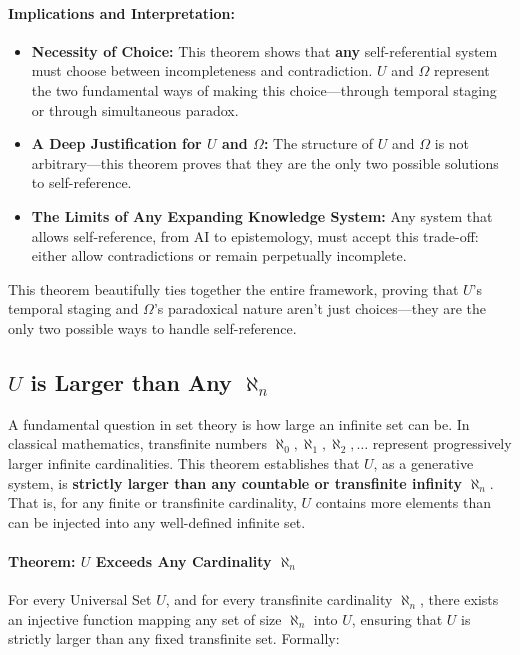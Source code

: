 \documentclass[12pt]{article}
\begin{document}
\paragraph{Implications and Interpretation:}
\begin{itemize}
    \item \textbf{Necessity of Choice:} This theorem shows that \textbf{any} self-referential system must choose between incompleteness and contradiction. \( U \) and \( \Omega \) represent the two fundamental ways of making this choice—through temporal staging or through simultaneous paradox.
    \item \textbf{A Deep Justification for \( U \) and \( \Omega \):} The structure of \( U \) and \( \Omega \) is not arbitrary—this theorem proves that they are the only two possible solutions to self-reference.
    \item \textbf{The Limits of Any Expanding Knowledge System:} Any system that allows self-reference, from AI to epistemology, must accept this trade-off: either allow contradictions or remain perpetually incomplete.
\end{itemize}

This theorem beautifully ties together the entire framework, proving that \( U \)'s temporal staging and \( \Omega \)'s paradoxical nature aren’t just choices—they are the only two possible ways to handle self-reference.


\subsection{\( U \) is Larger than Any \( \aleph_n \)}

A fundamental question in set theory is how large an infinite set can be. In classical mathematics, transfinite numbers \( \aleph_0, \aleph_1, \aleph_2, \dots \) represent progressively larger infinite cardinalities. This theorem establishes that \( U \), as a generative system, is \textbf{strictly larger than any countable or transfinite infinity} \( \aleph_n \). That is, for any finite or transfinite cardinality, \( U \) contains more elements than can be injected into any well-defined infinite set.

\paragraph{Theorem: \( U \) Exceeds Any Cardinality \( \aleph_n \)}
For every Universal Set \( U \), and for every transfinite cardinality \( \aleph_n \), there exists an injective function mapping any set of size \( \aleph_n \) into \( U \), ensuring that \( U \) is strictly larger than any fixed transfinite set. Formally:
\end{document}
